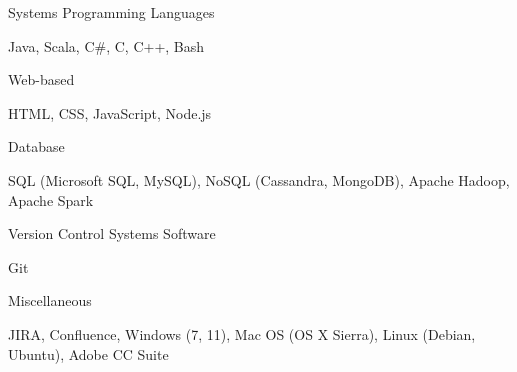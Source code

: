 \begin{cventries}
  \cventry
    {Systems}
    {Programming Languages}
    { }
    { }
    {
      \begin{cvitems}
        \item {Java, Scala, C\#, C, C++, Bash}
      \end{cvitems}
    }
  \cventry
    {Web-based}
    { }
    { }
    { }
    {
      \begin{cvitems}
        \item {HTML, CSS, JavaScript, Node.js}
      \end{cvitems}
    }
  \cventry
    {Database}
    { }
    { }
    { }
    {
      \begin{cvitems}
        \item {SQL (Microsoft SQL, MySQL), NoSQL (Cassandra, MongoDB), Apache Hadoop, Apache Spark}
      \end{cvitems}
    }
  \cventry
    {Version Control Systems}
    {Software}
    { }
    { }
    {
      \begin{cvitems}
        \item {Git}
      \end{cvitems}
    }
  \cventry
    {Miscellaneous}
    { }
    { }
    { }
    {
      \begin{cvitems}
        \item {JIRA, Confluence, Windows (7, 11), Mac OS (OS X Sierra), Linux (Debian, Ubuntu), Adobe CC Suite}
      \end{cvitems}
    }
\end{cventries}